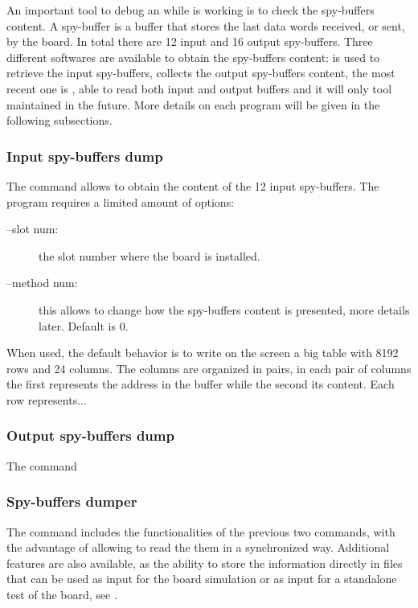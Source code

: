 An important tool to debug an \AMBoard while is working is to check the
spy-buffers content. A spy-buffer is a buffer that stores the last data words
received, or sent, by the board. In total there are 12 input and 16 output
spy-buffers. Three different softwares are available to obtain the spy-buffers
content: \textbf{\texttt{}} is used to retrieve
the input spy-buffers, \textbf{\texttt{}} 
collects the output spy-buffers content, 
the most recent one is 
\textbf{\texttt{}}, able to read
both input and output buffers and it will only tool maintained in the future.
More details on each program will be given in the following subsections.

\subsubsection{Input spy-buffers dump}

The \textbf{\texttt{}} command
allows to obtain the content of the 12 input spy-buffers. The program 
requires a limited amount of options:
\begin{description}
\item[--slot num:] the slot number where the board is installed.

\item[--method num:] this allows to change how the spy-buffers content is presented,
more details later. Default is 0.
\end{description}

When used, the default behavior is to write on the screen a big table with 8192 rows
and 24 columns. The columns are organized in pairs, in 
each pair of columns the first represents the address in the buffer while the second
its content. Each row represents...

\subsubsection{Output spy-buffers dump}

The \textbf{\texttt{}} command

\subsubsection{Spy-buffers dumper}
The \textbf{\texttt{}} command includes
the functionalities of the previous two commands, with the advantage of allowing to
read the them in a synchronized way. Additional features are also available, as
the ability to store the information directly in files that can be used as input
for the board simulation or as input for a standalone test of the board, see
\pageref{sec:boardsim}.